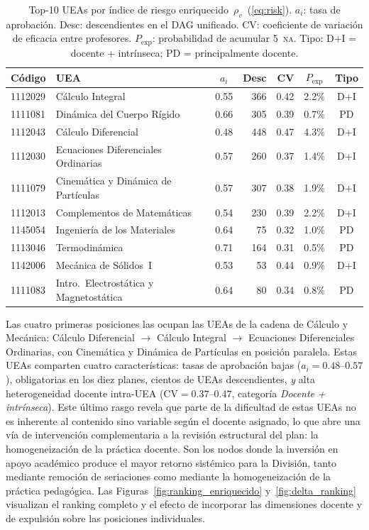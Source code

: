 \documentclass[11pt,letterpaper]{article}
\begin{document}
\begin{table}[H]\centering
\caption{Top-10 UEAs por índice de riesgo enriquecido~$\rho_v$~(\ref{eq:risk}).
  $a_i$: tasa de aprobación.
  Desc: descendientes en el DAG unificado.
  CV: coeficiente de variación de eficacia entre profesores.
  $P_{\mathrm{exp}}$: probabilidad de acumular 5~\textsc{na}.
  Tipo: D+I = docente + intrínseca; PD = principalmente docente.}
\label{tab:top10_riesgo}
\small
\begin{tabular}{llcrrcc}
\toprule
Código & UEA & $a_i$ & Desc & CV & $P_{\mathrm{exp}}$ & Tipo \\
\midrule
1112029 & Cálculo Integral                            & 0.55 & 366 & 0.42 & 2.2\% & D+I \\
1111081 & Dinámica del Cuerpo Rígido                  & 0.66 & 305 & 0.39 & 0.7\% & PD  \\
1112043 & Cálculo Diferencial                         & 0.48 & 448 & 0.47 & 4.3\% & D+I \\
1112030 & Ecuaciones Diferenciales Ordinarias         & 0.57 & 260 & 0.37 & 1.4\% & D+I \\
1111079 & Cinemática y Dinámica de Partículas         & 0.57 & 307 & 0.38 & 1.9\% & D+I \\
1112013 & Complementos de Matemáticas                & 0.54 & 230 & 0.39 & 2.2\% & D+I \\
1145054 & Ingeniería de los Materiales                & 0.64 &  75 & 0.32 & 1.0\% & PD  \\
1113046 & Termodinámica                               & 0.71 & 164 & 0.31 & 0.5\% & PD  \\
1142006 & Mecánica de Sólidos~I                       & 0.53 &  53 & 0.44 & 0.9\% & D+I \\
1111083 & Intro.\ Electrostática y Magnetostática     & 0.64 &  80 & 0.34 & 0.8\% & PD  \\
\bottomrule
\end{tabular}
\end{table}

Las cuatro primeras posiciones las ocupan las UEAs de la cadena de Cálculo
y Mecánica: Cálculo Diferencial $\to$ Cálculo Integral $\to$ Ecuaciones Diferenciales
Ordinarias, con Cinemática y Dinámica de Partículas en posición paralela.
Estas UEAs comparten cuatro características: tasas de aprobación bajas
($a_i = 0.48$--$0.57$), obligatorias en los diez planes, cientos de UEAs
descendientes, \emph{y} alta heterogeneidad docente intra-UEA
($\mathrm{CV} = 0.37$--$0.47$, categoría \emph{Docente + intrínseca}).
Este último rasgo revela que parte de la dificultad de estas UEAs no es
inherente al contenido sino variable según el docente asignado,
lo que abre una vía de intervención complementaria a la revisión estructural
del plan: la homogeneización de la práctica docente.
Son los nodos donde la inversión en apoyo académico produce el mayor retorno
sistémico para la División, tanto mediante remoción de seriaciones como mediante
la homogeneización de la práctica pedagógica.
Las Figuras~\ref{fig:ranking_enriquecido} y~\ref{fig:delta_ranking} visualizan
el ranking completo y el efecto de incorporar las dimensiones docente y de
expulsión sobre las posiciones individuales.
\end{document}
